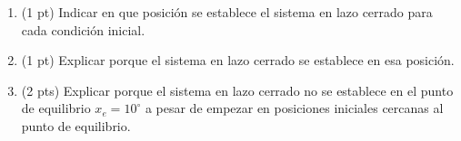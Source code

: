 \begin{enumerate}
	\item (1 pt) Indicar en que posición se establece el sistema en lazo cerrado para cada condición inicial.
	
	\item (1 pt)  Explicar porque el sistema en lazo cerrado se establece en esa posición.	
	
	\item (2 pts) Explicar porque el sistema en lazo cerrado no se establece en el punto de equilibrio $x_e=10^{\circ}$ a pesar de empezar en posiciones iniciales cercanas al punto de equilibrio. 

\end{enumerate}
